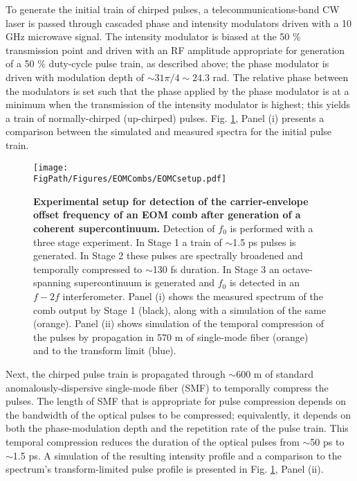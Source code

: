 To generate the initial train of chirped pulses, a telecommunications-band CW laser is passed through cascaded phase and intensity modulators driven with a 10 GHz microwave signal. The intensity modulator is biased at the 50 \% transmission point and driven with an RF amplitude appropriate for generation of a 50 $\%$ duty-cycle pulse train, as described above;  the phase modulator is driven with modulation depth of $\sim31\pi/4\sim24.3$ rad. The relative phase between the modulators is set such that the phase applied by the phase modulator is at a minimum when the transmission of the intensity modulator is highest; this yields a train of normally-chirped (up-chirped) pulses. Fig. \ref{fig:EOMC_Schematic}, Panel (i) presents a comparison between the simulated and measured spectra for the initial pulse train. 


\begin{figure}[htpb]
	\begin{center}
		\texttt{[image: \\FigPath/Figures/EOMCombs/EOMCsetup.pdf]}
	\end{center}
	\caption[Experimental setup for detection of the carrier-envelope offset frequency of an EOM comb after generation of a coherent supercontinuum]{\textbf{Experimental setup for detection of the carrier-envelope offset frequency of an EOM comb after generation of a coherent supercontinuum.} Detection of $f_0$ is performed with a three stage experiment. In Stage 1 a train of $\sim$1.5 ps pulses is generated. In Stage 2 these pulses are spectrally broadened and temporally compressed to $\sim$130 fs duration. In Stage 3 an octave-spanning supercontinuum is generated and $f_0$ is detected in an $f-2f$ interferometer. Panel (i) shows the measured spectrum of the comb output by Stage 1 (black), along with a simulation of the same (orange). Panel (ii) shows simulation of the temporal compression of the pulses by propagation in 570 m of single-mode fiber (orange) and to the transform limit (blue).}
	\label{fig:EOMC_Schematic}
\end{figure} 


Next, the chirped pulse train is propagated through $\sim$600 m of standard anomalously-dispersive single-mode fiber (SMF) to temporally compress the pulses. The length of SMF that is appropriate for pulse compression depends on the bandwidth of the optical pulses to be compressed; equivalently, it depends on both the phase-modulation depth and the repetition rate of the pulse train. This temporal compression reduces the duration of the optical pulses from $\sim$50 ps to $\sim$1.5 ps. A simulation of the resulting intensity profile and a comparison to the spectrum's transform-limited pulse profile is presented in Fig. \ref{fig:EOMC_Schematic}, Panel (ii). 

